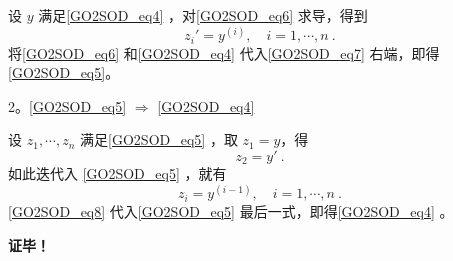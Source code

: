 设 $y$ 满足\autoref{GO2SOD_eq4} ，对\autoref{GO2SOD_eq6} 求导，得到
\begin{equation}\label{GO2SOD_eq7}
z_i'=y^{(i)},\quad i=1,\cdots,n~.
\end{equation}
将\autoref{GO2SOD_eq6} 和\autoref{GO2SOD_eq4} 代入\autoref{GO2SOD_eq7} 右端，即得\autoref{GO2SOD_eq5}。

2。\autoref{GO2SOD_eq5} $\Rightarrow$ \autoref{GO2SOD_eq4} 

设 $z_1,\cdots,z_n$ 满足\autoref{GO2SOD_eq5} ，取 $z_1=y$，得
\begin{equation}
z_2=y'~.
\end{equation}
如此迭代入 \autoref{GO2SOD_eq5} ，就有
\begin{equation}\label{GO2SOD_eq8}
z_i=y^{(i-1)},\quad i=1,\cdots,n~.
\end{equation}
\autoref{GO2SOD_eq8} 代入\autoref{GO2SOD_eq5} 最后一式，即得\autoref{GO2SOD_eq4} 。

\textbf{证毕！}

